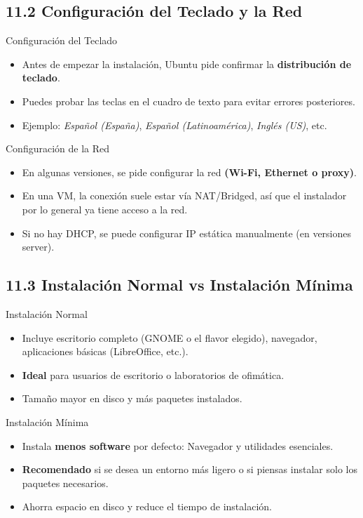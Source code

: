 \documentclass{beamer}
\begin{document}
\subsection{11.2 Configuración del Teclado y la Red}
\begin{frame}{Configuración del Teclado}
	\begin{itemize}
		\item Antes de empezar la instalación, Ubuntu pide confirmar la \textbf{distribución de teclado}.
		\item Puedes probar las teclas en el cuadro de texto para evitar errores posteriores.
		\item Ejemplo: \textit{Español (España)}, \textit{Español (Latinoamérica)}, \textit{Inglés (US)}, etc.
	\end{itemize}
\end{frame}

\begin{frame}{Configuración de la Red}
	\begin{itemize}
		\item En algunas versiones, se pide configurar la red \textbf{(Wi-Fi, Ethernet o proxy)}.
		\item En una VM, la conexión suele estar vía NAT/Bridged, así que el instalador por lo general ya tiene acceso a la red.
		\item Si no hay DHCP, se puede configurar IP estática manualmente (en versiones server).
	\end{itemize}
\end{frame}

\subsection{11.3 Instalación Normal vs Instalación Mínima}
\begin{frame}{Instalación Normal}
    \begin{itemize}
        \item Incluye escritorio completo (GNOME o el flavor elegido), navegador, aplicaciones básicas (LibreOffice, etc.).
        \item \textbf{Ideal} para usuarios de escritorio o laboratorios de ofimática.
        \item Tamaño mayor en disco y más paquetes instalados.
    \end{itemize}
\end{frame}

\begin{frame}{Instalación Mínima}
    \begin{itemize}
        \item Instala \textbf{menos software} por defecto: Navegador y utilidades esenciales.
        \item \textbf{Recomendado} si se desea un entorno más ligero o si piensas instalar solo los paquetes necesarios.
        \item Ahorra espacio en disco y reduce el tiempo de instalación.
    \end{itemize}
\end{frame}
\end{document}
